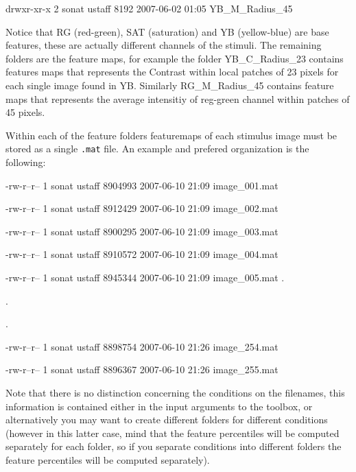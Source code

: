 \documentclass[a4paper,10pt]{report}
\begin{document}
\begin{description}
\begin{scriptsize}
drwxr-xr-x 2 sonat ustaff 8192 2007-06-02 01:05 YB\_M\_Radius\_45
\end{scriptsize}

\hspace{2cm}

Notice that RG (red-green), SAT (saturation) and YB (yellow-blue) are base features, these are actually different channels of the stimuli. The remaining folders are the feature maps, for example the folder YB\_C\_Radius\_23 contains features maps that represents the Contrast within local patches of 23 pixels for each single image found in YB. Similarly RG\_M\_Radius\_45 contains feature maps that represents the average intensitiy of reg-green channel within patches of 45 pixels.

Within each of the feature folders featuremaps of each stimulus image must be stored as a single \texttt{.mat} file. An example and prefered organization is the following:

\hspace{2cm}

\begin{scriptsize}
-rw-r--r-- 1 sonat ustaff 8904993 2007-06-10 21:09 image\_001.mat

-rw-r--r-- 1 sonat ustaff 8912429 2007-06-10 21:09 image\_002.mat

-rw-r--r-- 1 sonat ustaff 8900295 2007-06-10 21:09 image\_003.mat

-rw-r--r-- 1 sonat ustaff 8910572 2007-06-10 21:09 image\_004.mat

-rw-r--r-- 1 sonat ustaff 8945344 2007-06-10 21:09 image\_005.mat
.

.

.

-rw-r--r-- 1 sonat ustaff 8898754 2007-06-10 21:26 image\_254.mat

-rw-r--r-- 1 sonat ustaff 8896367 2007-06-10 21:26 image\_255.mat
\end{scriptsize}

\hspace{2cm}

Note that there is no distinction concerning the conditions on the filenames, this information is contained either in the input arguments to the toolbox, or alternatively you may want to create different folders for different conditions (however in this latter case, mind that the feature percentiles will be computed separately for each folder, so if you separate conditions into different folders the feature percentiles will be computed separately). 


\end{description}
\end{document}
